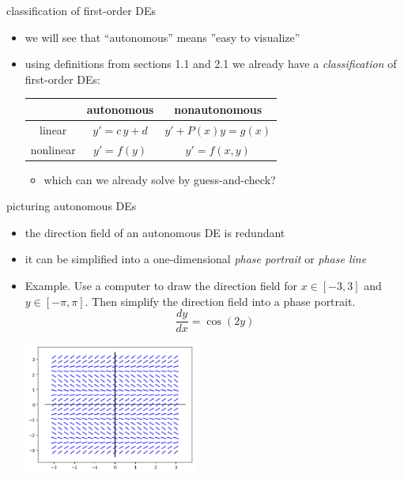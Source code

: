 \documentclass{beamer}
\begin{document}
\begin{frame}{classification of first-order DEs}

\begin{itemize}
\item we will see that ``autonomous'' means ''easy to visualize''
\item using definitions from sections 1.1 and 2.1 we already have a \emph{classification} of first-order DEs:

\medskip
\begin{center}
\begin{tabular}{c|c|c}
 & autonomous & nonautonomous \\ \hline
linear \Large\strut & $y' = c\, y + d$ & $y' + P(x) y = g(x)$ \\ \hline
nonlinear \Large\strut & $y' = f(y)$ & $y'=f(x,y)$
\end{tabular}
\end{center}

\medskip
    \begin{itemize}
    \item which can we already solve by guess-and-check?
    \end{itemize}
\end{itemize}

\vspace{20mm}
\end{frame}


\begin{frame}{picturing autonomous DEs}

\begin{itemize}
\item the direction field of an autonomous DE is redundant
\item it can be simplified into a one-dimensional \emph{phase portrait} or \emph{phase line}

\medskip
\item \begin{minipage}[t]{0.36\textwidth} \small
Example.  Use a computer to draw the direction field for $x \in [-3,3]$ and $y\in [-\pi,\pi]$.  Then simplify the direction field into a phase portrait. 
    $$\frac{dy}{dx} = \cos(2y)$$
\end{minipage}

\vspace{-36mm}
\hfill \includegraphics[width=0.45\textwidth]{figs/autonomous-cos} \phantom{dfjsdf}
\end{itemize}
\end{frame}
\end{document}
